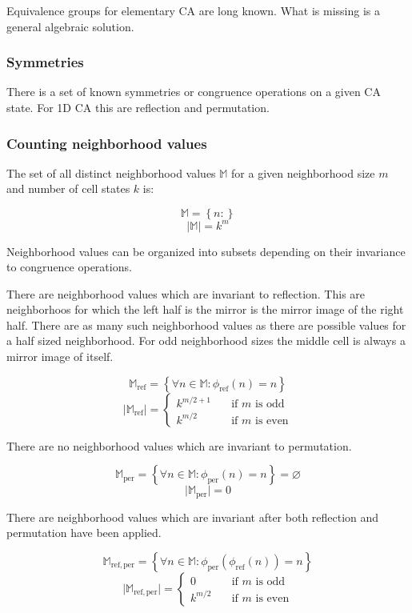 \documentclass{ijuc}
\begin{document}
Equivalence groups for elementary CA are long known. What is missing is a general algebraic solution.

\subsubsection{Symmetries}

There is a set of known symmetries or congruence operations on a given CA state.
For 1D CA this are reflection and permutation. 

\subsubsection{Counting neighborhood values}

The set of all distinct neighborhood values $\mathbb{M}$ for a given neighborhood size $m$ and
number of cell states $k$ is:

\[ \mathbb{M} = \left\{ n : \right\} \]
\[ \vert \mathbb{M} \vert = k^m \]

Neighborhood values can be organized into subsets depending on their invariance to congruence operations.

There are neighborhood values which are invariant to reflection. This are neighborhoos for which the
left half is the mirror is the mirror image of the right half. There are as many such neighborhood
values as there are possible values for a half sized neighborhood. For odd neighborhood sizes the middle
cell is always a mirror image of itself.

\[ \mathbb{M}_\mathrm{ref} = \left\{ \forall n \in \mathbb{M} : \phi_\mathrm{ref}(n) = n \right\} \]
\[ \vert \mathbb{M}_\mathrm{ref} \vert = \left\{ 
  \begin{array}{ll}
    {k^{m/2+1}} & \quad \textrm{if $m$ is odd }\\
    {k^{m/2  }} & \quad \textrm{if $m$ is even}
  \end{array} \right.
\]

There are no neighborhood values which are invariant to permutation.

\[ \mathbb{M}_\mathrm{per} = \left\{ \forall n \in \mathbb{M} : \phi_\mathrm{per}(n) = n \right\} = \varnothing \]
\[ \vert \mathbb{M}_\mathrm{per} \vert = 0 \]

There are neighborhood values which are invariant after both reflection and permutation have been applied.

\[ \mathbb{M}_\mathrm{ref,per} = \left\{ \forall n \in \mathbb{M} : \phi_\mathrm{per}(\phi_\mathrm{ref}(n)) = n \right\} \]
\[ \vert \mathbb{M}_\mathrm{ref,per} \vert = \left\{ 
  \begin{array}{ll}
    {0        } & \quad \textrm{if $m$ is odd }\\
    {k^{m/2  }} & \quad \textrm{if $m$ is even}
  \end{array} \right.
\]
\end{document}
